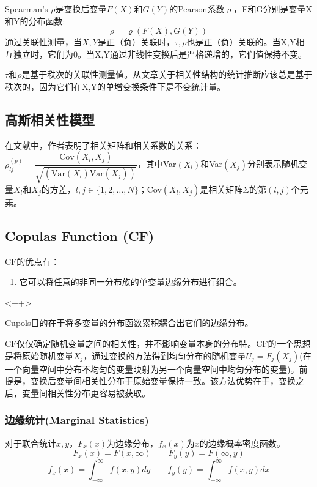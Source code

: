 Spearman's $\rho$是变换后变量$F(X)$和$G(Y)$的Pearson系数$\varrho$，F和G分别是变量X和Y的分布函数:
\begin{equation}
    \label{eq-rho}
    \rho = \varrho(F(X),G(Y))
\end{equation}
通过关联性测量，当$X,Y$是正（负）关联时，$\tau,\rho$也是正（负）关联的。当X,Y相互独立时，它们为0。当X,Y通过非线性变换后是严格递增的，它们值保持不变。

\textcolor[rgb]{1,0,0}{$\tau$和$\rho$是基于秩次的关联性测量值。从文章\cite{Genest2007}关于相关性结构的统计推断应该总是基于秩次的，因为它们在X,Y的单增变换条件下是不变统计量。}


\subsection{高斯相关性模型}
在文献\cite{Deligiannis2012}中，作者表明了相关矩阵和相关系数的关系：$\rho_{lj}^{(p)} = \dfrac{\text{Cov}(X_l,X_j)}{\sqrt{\left(\text{Var}(X_l)\text{Var}(X_j)\right)}}$，其中Var$(X_l)$和Var$(X_j)$分别表示随机变量$X_l$和$X_j$的方差，$l,j \in \{1,2,\dots,N\}$；Cov$(X_l,X_j)$是相关矩阵$\Sigma$的第$(l,j)$个元素。


\subsection{Copulas Function (CF)}
CF的优点有\cite{Smith2009}：
\begin{enumerate}
    \item 它可以将任意的非同一分布族的单变量边缘分布进行组合。
\end{enumerate}<++>

Cupols目的在于将多变量的分布函数累积耦合出它们的边缘分布。

CF仅仅确定随机变量之间的相关性，并不影响变量本身的分布特。CF的一个思想是将原始随机变量$X_j$，通过变换的方法得到均匀分布的随机变量$U_j = F_j(X_j)$(在一个向量空间中分布不均匀的变量映射为另一个向量空间中均匀分布的变量)。前提是，变换后变量间相关性分布于原始变量保持一致。该方法优势在于，变换之后，变量间相关性分布更容易被获取。
\subsubsection{边缘统计(Marginal Statistics)}
对于联合统计$x,y$，$F_x(x)$为边缘分布，$f_x(x)$为$x$的边缘概率密度函数。
\begin{equation}
    F_x(x) = F(x,\infty) \qquad F_y(y) = F(\infty,y)
    \label{eq0.1}
\end{equation}
\begin{equation}
    f_x(x) = \int_{-\infty}^{\infty} f(x,y) dy \qquad f_y(y) = \int_{-\infty}^{\infty} f(x,y) dx
    \label{eq0.2}
\end{equation}
